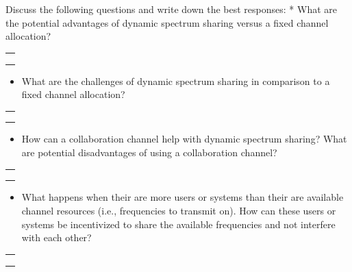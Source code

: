 \documentclass[11pt]{article}
\providecommand{\tightlist}{%
      \setlength{\itemsep}{0pt}\setlength{\parskip}{0pt}}
\begin{document}
Discuss the following questions and write down the best responses: *
What are the potential advantages of dynamic spectrum sharing versus a
fixed channel allocation?

\begin{longtable}[]{@{}l@{}}
\toprule
 \\
\midrule
\endhead
 \\
 \\
 \\
\bottomrule
\end{longtable}

\begin{itemize}
\tightlist
\item
  What are the challenges of dynamic spectrum sharing in comparison to a
  fixed channel allocation?
\end{itemize}

\begin{longtable}[]{@{}l@{}}
\toprule
 \\
\midrule
\endhead
 \\
 \\
 \\
\bottomrule
\end{longtable}

\begin{itemize}
\tightlist
\item
  How can a collaboration channel help with dynamic spectrum sharing?
  What are potential disadvantages of using a collaboration channel?
\end{itemize}

\begin{longtable}[]{@{}l@{}}
\toprule
 \\
\midrule
\endhead
 \\
 \\
 \\
\bottomrule
\end{longtable}

\begin{itemize}
\tightlist
\item
  What happens when their are more users or systems than their are
  available channel resources (i.e., frequencies to transmit on). How
  can these users or systems be incentivized to share the available
  frequencies and not interfere with each other?
\end{itemize}

\begin{longtable}[]{@{}l@{}}
\toprule
 \\
\midrule
\endhead
 \\
 \\
 \\
\bottomrule
\end{longtable}
\end{document}
